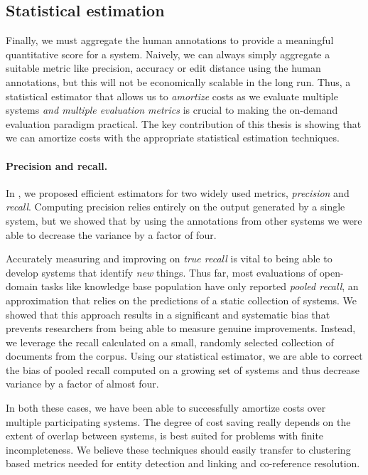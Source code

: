 \subsection{Statistical estimation}
Finally, we must aggregate the human annotations to provide a meaningful quantitative score for a system.
Naively, we can always simply aggregate a suitable metric like precision, accuracy or edit distance using the human annotations, but this will not be economically scalable in the long run.
Thus, a statistical estimator that allows us to \textit{amortize} costs as we evaluate multiple systems \textit{and multiple evaluation metrics} is crucial to making the on-demand evaluation paradigm practical.
The key contribution of this thesis is showing that we can amortize costs with the appropriate statistical estimation techniques.

\paragraph{Precision and recall.}
In , we proposed efficient estimators for two widely used metrics, \textit{precision} and \textit{recall}.
Computing precision relies entirely on the output generated by a single system, but we showed that by using the annotations from other systems we were able to decrease the variance by a factor of four.

Accurately measuring and improving on \textit{true recall} is vital to being able to develop systems that identify \textit{new} things.
Thus far, most evaluations of open-domain tasks like knowledge base population have only reported \textit{pooled recall}, an approximation that relies on the predictions of a static collection of systems.
We showed that this approach results in a significant and systematic bias that prevents researchers from being able to measure genuine improvements.  
Instead, we leverage the recall calculated on a small, randomly selected collection of documents from the corpus.
Using our statistical estimator, we are able to correct the bias of pooled recall computed on a growing set of systems and thus decrease variance by a factor of almost four.

In both these cases, we have been able to successfully amortize costs over multiple participating systems.
The degree of cost saving really depends on the extent of overlap between systems, is best suited for problems with finite incompleteness.
We believe these techniques should easily transfer to clustering based metrics needed for entity detection and linking and co-reference resolution.

